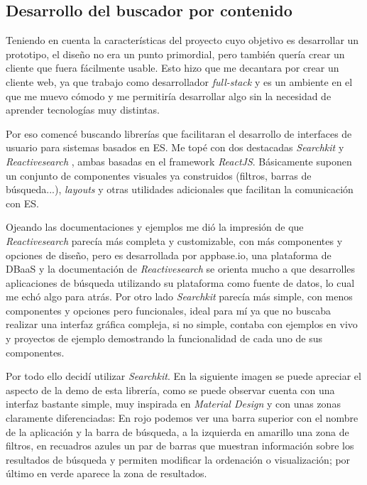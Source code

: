 \subsection{Desarrollo del buscador por contenido}
Teniendo en cuenta la características del proyecto cuyo objetivo es desarrollar un prototipo, el diseño no era un punto primordial, pero también quería crear un cliente que fuera fácilmente usable. Esto hizo que me decantara por crear un cliente web, ya que trabajo como desarrollador \textit{full-stack} y es un ambiente en el que me muevo cómodo y me permitiría desarrollar algo sin la necesidad de aprender tecnologías muy distintas.

Por eso comencé buscando librerías que facilitaran el desarrollo de interfaces de usuario para sistemas basados en \acrshort{ES}. Me topé con dos destacadas \textit{Searchkit} \cite{searchKit} y \textit{Reactivesearch} \cite{reactiveSearch}, ambas basadas en el \gls{framework} \textit{ReactJS}. Básicamente suponen un conjunto de componentes visuales ya construidos (filtros, barras de búsqueda...), \textit{layouts} y otras utilidades adicionales que facilitan la comunicación con \acrshort{ES}.

Ojeando las documentaciones y ejemplos me dió la impresión de que \textit{Reactivesearch} parecía más completa y customizable, con más componentes y opciones de diseño, pero es desarrollada por appbase.io, una plataforma de \acrshort{DBaaS} y la documentación de \textit{Reactivesearch} se orienta mucho a que desarrolles aplicaciones de búsqueda utilizando su plataforma como fuente de datos, lo cual me echó algo para atrás. Por otro lado \textit{Searchkit} parecía más simple, con menos componentes y opciones pero funcionales, ideal para mí ya que no buscaba realizar una interfaz gráfica compleja, si no simple, contaba con ejemplos en vivo y proyectos de ejemplo demostrando la funcionalidad de cada uno de sus componentes.

Por todo ello decidí utilizar \textit{Searchkit}. En la siguiente imagen se puede apreciar el aspecto de la demo de esta librería, como se puede observar cuenta con una interfaz bastante simple, muy inspirada en \textit{Material Design} \cite{materialDesign} y con unas zonas claramente diferenciadas: En rojo podemos ver una barra superior con el nombre de la aplicación y la barra de búsqueda, a la izquierda en amarillo una zona de filtros, en recuadros azules un par de barras que muestran información sobre los resultados de búsqueda y permiten modificar la ordenación o visualización; por último en verde aparece la zona de resultados.

